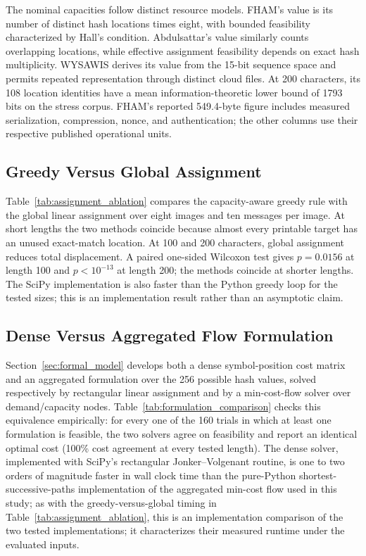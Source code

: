 \documentclass[preprint,12pt]{elsarticle}
\theoremstyle{plain}
\begin{document}
The nominal capacities follow distinct resource models. FHAM's value is its
number of distinct hash locations times eight, with bounded feasibility
characterized by Hall's condition. Abdulsattar's value similarly counts
overlapping locations, while effective assignment feasibility depends on exact hash
multiplicity. WYSAWIS derives its value from the 15-bit sequence space and
permits repeated representation through distinct cloud files. At 200
characters, its 108 location identities have a mean information-theoretic
lower bound of 1793 bits on the stress corpus. FHAM's reported 549.4-byte
figure includes measured serialization, compression, nonce, and
authentication; the other columns use their respective published operational
units.

\subsection{Greedy Versus Global Assignment}

Table~\ref{tab:assignment_ablation} compares the capacity-aware greedy rule
with the global linear assignment over eight images and ten messages per image.
At short lengths the two methods coincide because almost every printable target
has an unused exact-match location. At 100 and 200 characters, global
assignment reduces total displacement. A paired one-sided Wilcoxon test gives
$p=0.0156$ at length 100 and $p<10^{-13}$ at length 200; the methods coincide
at shorter lengths. The SciPy implementation is also faster
than the Python greedy loop for the tested sizes; this is an implementation
result rather than an asymptotic claim.

\begin{table}[!t]
\centering
\caption{Assignment Ablation: Mean Total Displacement and Assignment Time}
\label{tab:assignment_ablation}

\end{table}

\subsection{Dense Versus Aggregated Flow Formulation}

Section~\ref{sec:formal_model} develops both a dense symbol-position cost
matrix and an aggregated formulation over the 256 possible hash values,
solved respectively by rectangular linear assignment and by a min-cost-flow
solver over demand/capacity nodes. Table~\ref{tab:formulation_comparison}
checks this equivalence empirically: for every one of the 160 trials in which
at least one formulation is feasible, the two solvers agree on feasibility
and report an identical optimal cost (100\% cost agreement at every tested
length). The dense solver, implemented with SciPy's rectangular
Jonker--Volgenant routine, is one to two orders of magnitude faster in wall
clock time than the pure-Python shortest-successive-paths implementation of
the aggregated min-cost flow used in this study; as with the greedy-versus-global
timing in Table~\ref{tab:assignment_ablation}, this is an implementation
comparison of the two tested implementations; it characterizes their measured
runtime under the evaluated inputs.
\end{document}

